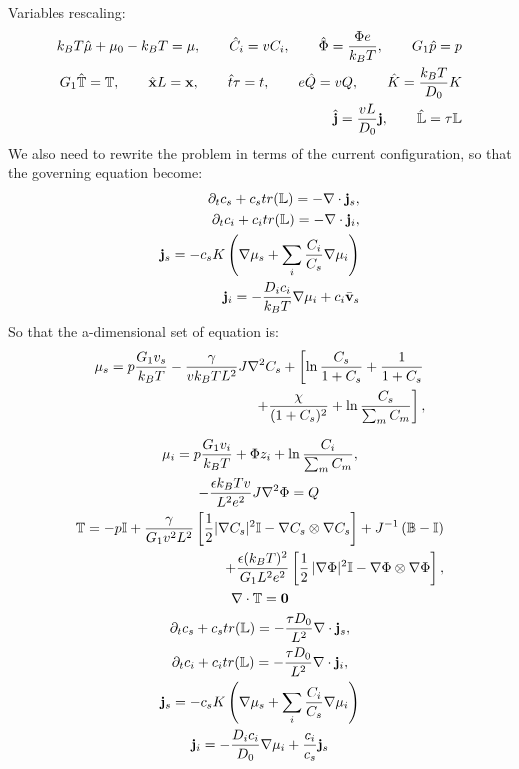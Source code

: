 Variables rescaling:
\begin{equation*}
\begin{aligned}
k_BT\hat{\mu} + \mu_0 -k_BT= \mu, \qquad \hat{C}_i = vC_i, \qquad \hat{\Phi} = \frac{\Phi e}{k_B T}, \qquad  G_1\hat{p}= p\\
G_1\hat{\mathbb{T}}=\mathbb{T}, \qquad\hat{\mathbf{x}} L =\mathbf{x}, \qquad \hat{t}\tau=t, \qquad e\hat{Q} =v Q, \qquad \hat{K} = \frac{k_BT}{D_0}K\\
\hat{\mathbf{j}}=\frac{vL}{D_0}\mathbf{j}, \qquad \hat{\mathbb{L}}= \tau \mathbb{L}
\end{aligned}
\end{equation*}
We also need to rewrite the problem in terms of the current configuration, so that the governing equation become:
\begin{eqnarray}
\partial_t c_s + c_s tr(\mathbb{L})=-\nabla \cdot\mathbf{j}_s,\\
\partial_t c_i + c_i tr(\mathbb{L})= -\nabla\cdot\mathbf{j}_i,\\
\mathbf{j}_s =-c_sK  \left(\nabla \mu_s +\sum_i \frac{C_i}{C_s} \nabla \mu_i\right)\\
\mathbf{j}_i= - \frac{D_ic_i}{k_B T}\nabla \mu_i + c_i\bar{\mathbf{v}}_s
\end{eqnarray}
So that the a-dimensional set of equation is:
\begin{gather}
\begin{aligned}
\mu_s = p \frac{G_1v_s}{k_BT} - \frac{\gamma}{vk_BT L^2} J \nabla^2 C_s + \left[\ln \frac{C_s}{1+C_s} + \frac{1}{1+C_s}\right.\\
\left.\ \ \ \ \ \ +\frac{\chi}{(1+C_s)^2} + \ln \frac{C_s}{\sum_m C_m} \right], 
\end{aligned}\\[2.5mm]
\mu_i = p \frac{G_1v_i}{k_BT} + \Phi z_i + \ln \frac{C_i}{\sum_m C_m} ,\\
-\frac{\epsilon k_B Tv}{L^2e^2} J \nabla^2 \Phi = Q\, \\
\begin{aligned}
\mathbb{T}= -p \mathbb{I} +\frac{\gamma }{G_1v^2L^2} \left[\frac{1}{2} |\nabla C_s|^2\mathbb{I} - \nabla C_s \otimes \nabla C_s\right]+ J^{-1}\left(\mathbb{B}-\mathbb{I}\right)\\
+ \frac{\epsilon (k_BT)^2}{G_1L^2e^2} \left[\frac{1}{2} \,|\nabla \Phi|^2\mathbb{I} -\nabla \Phi \otimes \nabla \Phi\right],
\end{aligned}\\
\nabla \cdot \mathbb{T}=\mathbf{0}\\
\partial_t c_s + c_s tr(\mathbb{L})=- \frac{\tau D_0}{L^2}\nabla \cdot\mathbf{j}_s,\\
\partial_t c_i + c_i tr(\mathbb{L})= -\frac{\tau D_0}{L^2}\nabla\cdot\mathbf{j}_i,\\
\mathbf{j}_s =-c_sK  \left(\nabla \mu_s +\sum_i \frac{C_i}{C_s} \nabla \mu_i\right)\\
\mathbf{j}_i= - \frac{D_ic_i}{D_0}\nabla \mu_i + \frac{c_i}{c_s}\mathbf{j}_s
\end{gather}

